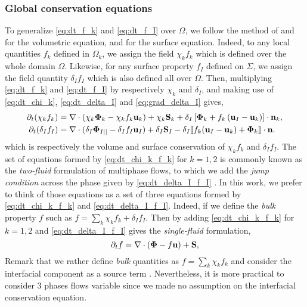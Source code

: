 \subsubsection*{Global conservation equations}

To generalize \ref{eq:dt_f_k} and \ref{eq:dt_f_I} over $\Omega$, we follow the method of \citet{drew1983mathematical} and \citet{kataoka1986local} for the volumetric equation, and \citet{marle1982macroscopic} for the surface equation.
Indeed, to any local quantities $f_k$ defined in $\Omega_k$, we assign the field $\chi_k f_k$ which is defined over the whole domain $\Omega$. 
Likewise, for any surface property $f_I$ defined on $\Sigma$, we assign the field quantity $\delta_I f_I$ which is also defined all over $\Omega$. 
Then, multiplying \ref{eq:dt_f_k} and \ref{eq:dt_f_I} by respectively $\chi_k$ and $\delta_I$, and making use of \ref{eq:dt_chi_k}, \ref{eq:dt_delta_I} and \ref{eq:grad_delta_I} gives, 
\begin{align}
    \partial_t (\chi_k f_k)
    &= \mathbf{\nabla} \cdot (\chi_k \mathbf{\Phi}_k - \chi_k f_k \textbf{u}_k)
    + \chi_k \textbf{S}_k
    + \delta_I\left[
        \mathbf{\Phi}_k
        + f_k
        \left(
            \textbf{u}_I
            - \textbf{u}_k
        \right)
    \right]
    \cdot \textbf{n}_k ,
    \label{eq:dt_chi_k_f_k}\\
    \partial_t (\delta_If_I)  
    &= 
    \mathbf{\nabla} \cdot (\delta_I \mathbf{\Phi}_{I||} - \delta_I f_I \textbf{u}_I)
    +\delta_I\textbf{S}_I 
    - \delta_I \llbracket 
    f_k (\textbf{u}_I - \textbf{u}_k)
    + \mathbf{\Phi}_k
     \rrbracket \cdot \textbf{n}.
    \label{eq:dt_delta_I_f_I}
\end{align}
which is respectively the volume and surface conservation of $\chi_kf_k$ and $\delta_If_I$. 
The set of equations formed by \ref{eq:dt_chi_k_f_k} for $k =1,2$ is commonly known as the \textit{two-fluid} formulation of multiphase flows, to which we add the \textit{jump condition} across the phase given by \ref{eq:dt_delta_I_f_I} \citep{morel2015mathematical,tryggvason2011direct,drew1983mathematical,kataoka1986local}. 
In this work, we prefer to think of those equations as a set of three equations formed by \ref{eq:dt_chi_k_f_k} and \ref{eq:dt_delta_I_f_I}. 
Indeed, if we define the \textit{bulk} property $f$ such as $f = \sum_k \chi_k f_k + \delta_I f_I$.
Then by adding \ref{eq:dt_chi_k_f_k} for $k=1,2$ and \ref{eq:dt_delta_I_f_I} gives the \textit{single-fluid} formulation,
\begin{equation}
    \partial_t f
    = \mathbf{\nabla} \cdot (\mathbf{\Phi} - f \textbf{u})
    + \textbf{S},
    \label{eq:dt_f}
\end{equation}
Remark that we rather define \textit{bulk} quantities as $f = \sum_k \chi_k f_k$ and consider the interfacial component as a source term \citep{morel2015mathematical,tryggvason2011direct,drew1983mathematical}. 
Nevertheless, it is more practical to consider 3 phases flows variable since we made no assumption on the interfacial conservation equation. 
